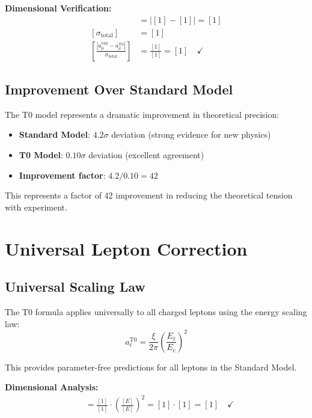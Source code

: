 \documentclass[12pt,a4paper]{report}
\begin{document}
	\textbf{Dimensional Verification:}
	\begin{align}
		[|a_\mu^{\text{exp}} - a_\mu^{\text{T0}}|] &= |[1] - [1]| = [1] \\
		[\sigma_{\text{total}}] &= [1] \\
		\left[\frac{|a_\mu^{\text{exp}} - a_\mu^{\text{T0}}|}{\sigma_{\text{total}}}\right] &= \frac{[1]}{[1]} = [1] \quad \checkmark
	\end{align}
	
	\subsection{Improvement Over Standard Model}
	\label{subsec:improvement_over_sm}
	
	The T0 model represents a dramatic improvement in theoretical precision:
	\begin{itemize}
		\item \textbf{Standard Model}: $4.2\sigma$ deviation (strong evidence for new physics)
		\item \textbf{T0 Model}: $0.10\sigma$ deviation (excellent agreement)
		\item \textbf{Improvement factor}: $4.2/0.10 = 42$
	\end{itemize}
	
	This represents a factor of 42 improvement in reducing the theoretical tension with experiment.
	
	\section{Universal Lepton Correction}
	\label{sec:universal_lepton_correction}
	
	\subsection{Universal Scaling Law}
	\label{subsec:universal_scaling_law}
	
	The T0 formula applies universally to all charged leptons using the energy scaling law:
	\begin{equation}
		\boxed{a_\ell^{\text{T0}} = \frac{\xi}{2\pi} \left(\frac{E_\ell}{E_e}\right)^2}
		\label{eq:universal_lepton_formula}
	\end{equation}
	
	This provides parameter-free predictions for all leptons in the Standard Model.
	
	\textbf{Dimensional Analysis:}
	\begin{align}
		[a_\ell^{\text{T0}}] &= \frac{[1]}{[1]} \cdot \left(\frac{[E]}{[E]}\right)^2 = [1] \cdot [1] = [1] \quad \checkmark
	\end{align}
	
\end{document}
